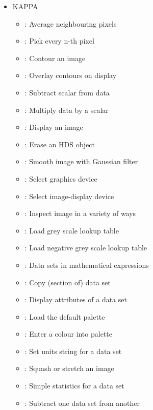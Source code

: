 \documentclass[11pt,noabs]{starlink}
\begin{document}
\begin{itemize}
\item KAPPA 
   \begin{itemize}
   \item {}: Average neighbouring pixels
   \item {}: Pick every n-th pixel
   \item {}: Contour an image
   \item {}: Overlay contours on display
   \item {}: Subtract scalar from data
   \item {}: Multiply data by a scalar
   \item {}: Display an image
   \item {}: Erase an HDS object
   \item {}: Smooth image with Gaussian filter
   \item {}: Select graphics device
   \item {}: Select image-display device
   \item {}: Inspect image in a variety of ways
   \item {}: Load grey scale lookup table
   \item {}: Load negative grey scale lookup table
   \item {}: Data sets in mathematical expressions
   \item {}: Copy (section of) data set
   \item {}: Display attributes of a data set
   \item {}: Load the default palette
   \item {}: Enter a colour into palette
   \item {}: Set units string for a data set
   \item {}: Squash or stretch an image
   \item {}: Simple statistics for a data set
   \item {}: Subtract one data set from another

\end{itemize}
\end{itemize}
\end{document}
